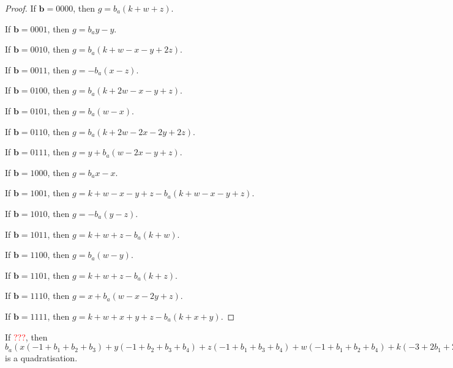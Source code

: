 \documentclass[11pt]{scrartcl}
\newcommand{\vc}[1]{\boldsymbol{#1}}
\begin{document}
\begin{proof}
If $\vc b = 0000$, then $g = b_a(k + w + z)$.

If $\vc b = 0001$, then $g = b_ay - y$.

If $\vc b = 0010$, then $g = b_a(k + w - x - y + 2z)$.

If $\vc b = 0011$, then $g = -b_a(x - z)$.

If $\vc b = 0100$, then $g = b_a(k + 2w - x - y + z)$.

If $\vc b = 0101$, then $g = b_a(w - x)$.

If $\vc b = 0110$, then $g = b_a(k + 2w - 2x - 2y + 2z)$.

If $\vc b = 0111$, then $g = y + b_a(w - 2x - y + z)$.

If $\vc b = 1000$, then $g = b_ax - x$.

If $\vc b = 1001$, then $g = k + w - x - y + z - b_a(k + w - x - y + z)$.

If $\vc b = 1010$, then $g = -b_a(y - z)$.

If $\vc b = 1011$, then $g = k + w + z - b_a(k + w)$.

If $\vc b = 1100$, then $g = b_a(w - y)$.

If $\vc b = 1101$, then $g = k + w + z - b_a(k + z)$.

If $\vc b = 1110$, then $g = x + b_a(w - x - 2y + z)$.

If $\vc b = 1111$, then $g = k + w + x + y + z - b_a(k + x + y)$.

\end{proof}

\begin{lemma}
 If \textcolor{red}{???}, then $b_a(x(-1+b_1+b_2+b_3)+y(-1+b_2+b_3+b_4)+z(-1+b_1+b_3+b_4)+w(-1+b_1+b_2+b_4)+k(-3+2b_1+2b_2+2b_3+2b_4))+x(+1 -b_1-b_2-b_3+b_1b_2+b_1b_3+b_2b_3)+y(+1 -b_2-b_3-b_4+b_2b_3+b_2b_4+b_3b_4)+z(+1 -b_1-b_3-b_4+b_1b_3+b_1b_4+b_3b_4)+w(+1 -b_1-b_2-b_4+b_1b_2+b_1b_4+b_2b_4)+k(+3 -2 b_1-2 b_2-2 b_3-2 b_4+b_1b_2+b_1b_3+b_1b_4+b_2b_3+b_2b_4+b_3b_4)$ is a quadratisation.\\
 \end{lemma}
\end{document}
